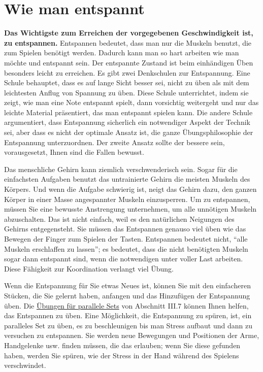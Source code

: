 \section{Wie man entspannt}\hypertarget{c1ii14}{}

\textbf{Das Wichtigste zum Erreichen der vorgegebenen Geschwindigkeit ist, zu entspannen.}
Entspannen bedeutet, dass man nur die Muskeln benutzt, die zum Spielen benötigt werden.
Dadurch kann man so hart arbeiten wie man möchte und entspannt sein.
Der entspannte Zustand ist beim einhändigen Üben besonders leicht zu erreichen.
Es gibt zwei Denkschulen zur Entspannung.
Eine Schule behauptet, dass es auf lange Sicht besser sei, nicht zu üben als mit dem leichtesten Anflug von Spannung zu üben.
Diese Schule unterrichtet, indem sie zeigt, wie man eine Note entspannt spielt, dann vorsichtig weitergeht und nur das leichte Material präsentiert, das man entspannt spielen kann.
Die andere Schule argumentiert, dass Entspannung sicherlich ein notwendiger Aspekt der Technik sei, aber dass es nicht der optimale Ansatz ist, die ganze Übungsphilosophie der Entspannung unterzuordnen.
Der zweite Ansatz sollte der bessere sein, vorausgesetzt, Ihnen sind die Fallen bewusst.

Das menschliche Gehirn kann ziemlich verschwenderisch sein.
Sogar für die einfachsten Aufgaben benutzt das untrainierte Gehirn die meisten Muskeln des Körpers.
Und wenn die Aufgabe schwierig ist, neigt das Gehirn dazu, den ganzen Körper in einer Masse angespannter Muskeln einzusperren.
Um zu entspannen, müssen Sie eine bewusste Anstrengung unternehmen, um alle unnötigen Muskeln abzuschalten.
Das ist nicht einfach, weil es den natürlichen Neigungen des Gehirns entgegensteht.
Sie müssen das Entspannen genauso viel üben wie das Bewegen der Finger zum Spielen der Tasten.
Entspannen bedeutet nicht, \enquote{alle Muskeln erschlaffen zu lassen}; es bedeutet, dass die nicht benötigten Muskeln sogar dann entspannt sind, wenn die notwendigen unter voller Last arbeiten.
Diese Fähigkeit zur Koordination verlangt viel Übung.

Wenn die Entspannung für Sie etwas Neues ist, können Sie mit den einfacheren Stücken, die Sie gelernt haben, anfangen und das Hinzufügen der Entspannung üben.
Die \hyperlink{c1iii7b}{Übungen für parallele Sets} von Abschnitt III.7 können Ihnen helfen, das Entspannen zu üben.
Eine Möglichkeit, die Entspannung zu spüren, ist, ein paralleles Set zu üben, es zu beschleunigen bis man Stress aufbaut und dann zu versuchen zu entspannen.
Sie werden neue Bewegungen und Positionen der Arme, Handgelenke usw. finden müssen, die das erlauben; wenn Sie diese gefunden haben, werden Sie spüren, wie der Stress in der Hand während des Spielens verschwindet.

